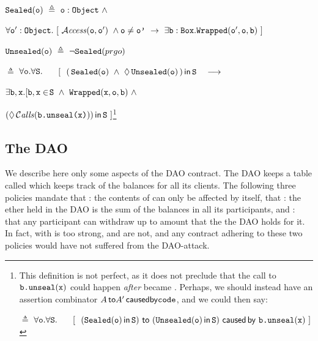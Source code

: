 $\prg{Sealed}(\prg{o}) \  \triangleq\ \prg{o}:\prg{Object}\ \wedge$\\
\strut \hspace{2.75cm}$ \forall \prg{o}':\prg{Object}.\ [ \ \CanAccess{\prg{o}}{\prg{o}'}\ \wedge \prg{o}\neq\prg{o'}\ \rightarrow\ \exists \prg{b}:\prg{Box}.\prg{Wrapped}(\prg{o}',\prg{o},\prg{b})\ ]$

$\prg{Unsealed}(\prg{o}) \  \triangleq\ \neg \prg{Sealed}(prg{o})$

\hspace{.05cm}

 $\triangleq$  $\forall {\mbox{\tt{o}}}.\forall{{\mbox{\tt{S}}}}.$ \ \
$[\ \ \Using{(\, \prg{Sealed}(\prg{o}) \ \wedge\ {\Future{\prg{Unsealed}({\prg{o}})}}\, )}{\prg{S}} \ \ \ \longrightarrow $\\
\strut \hspace{8cm}$ \exists \prg{b},\prg{x}.[ \prg{b},\prg{x}\in\!\prg{S}\ \wedge\   \prg{Wrapped}(\prg{x},\prg{o},\prg{b}) \ \wedge$\\
\strut \hspace{9cm}$\Using{(\Future{\Calls{\prg{b.unseal}(\prg{x})}})}{\prg{S}}\ ]
$\footnote{This definition is not perfect, as it does not preclude that the call to ${\mbox{\tt{b.unseal}}}({\mbox{\tt{x}}})$ could happen {\em after}
\prg{o} became \prg{Unsealed}. Perhaps, we should instead have an assertion combinator ${A\, {\bf{\sf {to}}} A'\,{\bf{\sf {caused by}}} {\mbox{\tt{code}}}}$, and we could then say:

 $\triangleq$  $\forall {\mbox{\tt{o}}}.\forall{{\mbox{\tt{S}}}}.$ \ \
$[\ \ (\Using{{\prg{Sealed}(\prg{o})}}{\prg{S}}) \  \kw{to}\  (\Using{\prg{Unsealed}({\prg{o}})}{\prg{S}})\ \kw{caused\,by}\  \prg{b.unseal}{(\prg{x})} \ ]$
}




\subsection{The DAO }

We describe here only some aspects of the DAO contract.
The DAO keeps a table called  which keeps track of the balances for all its clients.
 The following three policies mandate that \Pol {DAO\_1}: the contents of  can only be affected by 
 itself, that : the ether held in the DAO is the sum of the balances in all its participants, and : that any
 participant can withdraw up to amount that the the DAO holds for it.
 In fact, with \Pol {DAO\_2} is too strong, \Pol {DAO\_1} and \Pol {DAO\_3} are not, and any
 contract adhering to these two policies would have not suffered from the DAO-attack\cite{...}.


